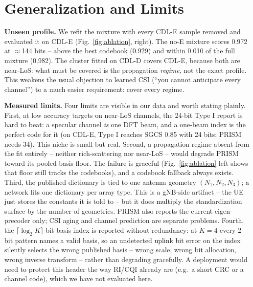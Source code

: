 \documentclass[conference]{IEEEtran}
\begin{document}
\section{Generalization and Limits}
\textbf{Unseen profile.} We refit the mixture with every CDL-E sample removed and evaluated it on CDL-E (Fig.~\ref{fig:ablation}, right). The no-E mixture scores 0.972 at $\approx$144 bits -- above the best codebook (0.929) and within 0.010 of the full mixture (0.982). The cluster fitted on CDL-D covers CDL-E, because both are near-LoS: what must be covered is the propagation \emph{regime}, not the exact profile. This weakens the usual objection to learned CSI (``you cannot anticipate every channel'') to a much easier requirement: cover every regime.

\textbf{Measured limits.} Four limits are visible in our data and worth stating plainly. First, at low accuracy targets on near-LoS channels, the 24-bit Type I report is hard to beat: a specular channel \emph{is} one DFT beam, and a one-beam index is the perfect code for it (on CDL-E, Type I reaches SGCS 0.85 with 24 bits; PRISM needs 34). This niche is small but real. Second, a propagation regime absent from the fit entirely -- neither rich-scattering nor near-LoS -- would degrade PRISM toward its pooled-basis floor. The failure is graceful (Fig.~\ref{fig:ablation} left shows that floor still tracks the codebooks), and a codebook fallback always exists. Third, the published dictionary is tied to one antenna geometry $(N_1,N_2,N_3)$; a network fits one dictionary per array type. This is a gNB-side artifact -- the UE just stores the constants it is told to -- but it does multiply the standardization surface by the number of geometries. PRISM also reports the current eigen-precoder only; CSI aging and channel prediction are separate problems. Fourth, the $\lceil\log_2 K\rceil$-bit basis index is reported without redundancy: at $K{=}4$ every 2-bit pattern names a valid basis, so an undetected uplink bit error on the index silently selects the wrong published basis -- wrong scale, wrong bit allocation, wrong inverse transform -- rather than degrading gracefully. A deployment would need to protect this header the way RI/CQI already are (e.g.\ a short CRC or a channel code), which we have not evaluated here.
\end{document}
